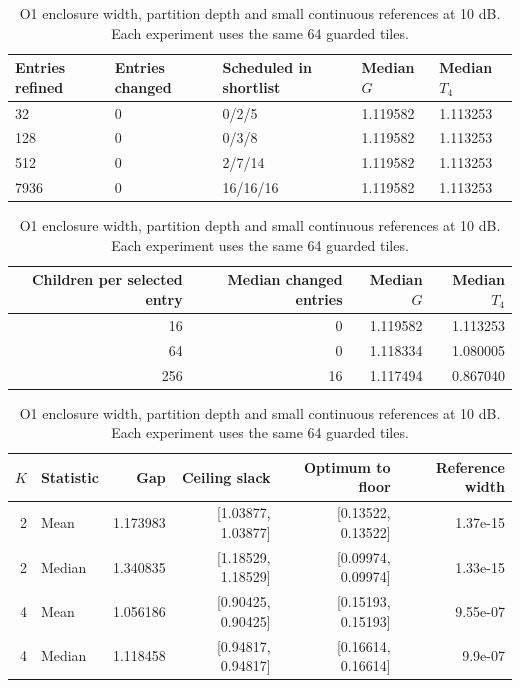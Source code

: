 \documentclass[10pt,letterpaper]{article}
\begin{document}
\begin{table}[htbp]\centering\small
\setlength{\tabcolsep}{4pt}
\caption{O1 enclosure width, partition depth and small continuous references at 10 dB. Each experiment uses the same 64 guarded tiles.}\label{supp:refinement}
\begin{tabular}{lllll}\toprule
Entries refined & Entries changed & Scheduled in shortlist & Median $G$ & Median $T_4$\\
\midrule
32 & 0 & 0/2/5 & 1.119582 & 1.113253\\
128 & 0 & 0/3/8 & 1.119582 & 1.113253\\
512 & 0 & 2/7/14 & 1.119582 & 1.113253\\
7936 & 0 & 16/16/16 & 1.119582 & 1.113253\\
\bottomrule\end{tabular}
\par\medskip\begin{minipage}{\linewidth}\small
\par\smallskip\noindent\begin{tabular}{rrrr}\toprule Children per selected entry & Median changed entries & Median $G$ & Median $T_4$\\\midrule
16 & 0 & 1.119582 & 1.113253\\
64 & 0 & 1.118334 & 1.080005\\
256 & 16 & 1.117494 & 0.867040\\
\bottomrule\end{tabular}\par\smallskip
\noindent\begin{tabular}{rlrrrr}\toprule $K$ & Statistic & Gap & Ceiling slack & Optimum to floor & Reference width\\\midrule
2 & Mean & 1.173983 & [1.03877, 1.03877] & [0.13522, 0.13522] & 1.37e-15\\
2 & Median & 1.340835 & [1.18529, 1.18529] & [0.09974, 0.09974] & 1.33e-15\\
4 & Mean & 1.056186 & [0.90425, 0.90425] & [0.15193, 0.15193] & 9.55e-07\\
4 & Median & 1.118458 & [0.94817, 0.94817] & [0.16614, 0.16614] & 9.9e-07\\
\bottomrule\end{tabular}\par\smallskip

\end{minipage}
\end{table}
\end{document}
